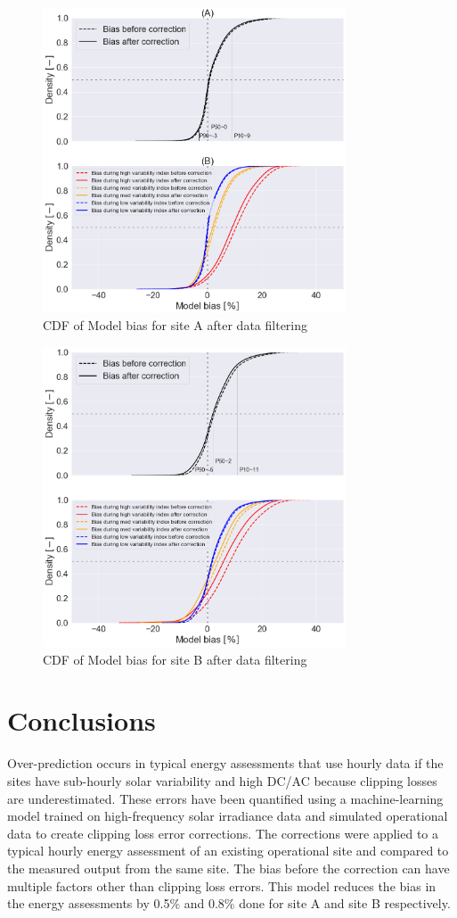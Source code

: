 \documentclass[conference]{IEEEtran}
\begin{document}
\begin{figure}[htbp]
\centerline{\includegraphics[width=9cm]{DCS_ModelBias_breakdown_AFTER_filter_CDF_v4.png}}
\caption{CDF of Model bias for site A after data filtering}
\label{fig:DCS-modelbias-after-filter-cdf}
\end{figure}

\begin{figure}[htbp]
\centerline{\includegraphics[width=9cm]{PAW_ModelBias_breakdown_AFTER_filter_CDF_v4.png}}
\caption{CDF of Model bias for site B after data filtering}
\label{fig:PAW-modelbias-after-filter-cdf}
\end{figure}

\section{Conclusions}
Over-prediction occurs in typical energy assessments that use hourly data if the sites have sub-hourly solar variability and high DC/AC because clipping losses are underestimated. These errors have been quantified using a machine-learning model trained on high-frequency solar irradiance data and simulated operational data to create clipping loss error corrections. The corrections were applied to a typical hourly energy assessment of an existing operational site and compared to the measured output from the same site. The bias before the correction can have multiple factors other than clipping loss errors. This model reduces the bias in the energy assessments by 0.5\% and 0.8\% done for site A and site B respectively.
\end{document}
